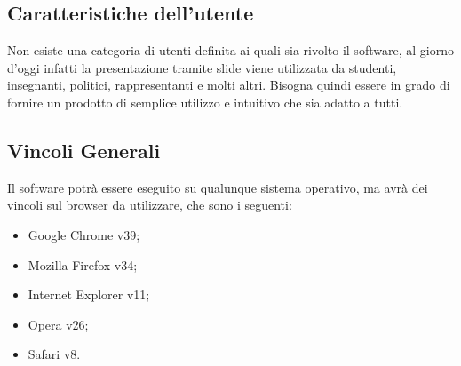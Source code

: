 \subsection{Caratteristiche dell'utente}
Non esiste una categoria di utenti definita ai quali sia rivolto il software, al giorno d'oggi infatti la presentazione tramite slide viene utilizzata da studenti, insegnanti, politici, rappresentanti e molti altri. Bisogna quindi essere in grado di fornire un prodotto di semplice utilizzo e intuitivo che sia adatto a tutti.

\subsection{Vincoli Generali}
Il software potrà essere eseguito su qualunque sistema operativo, ma avrà dei vincoli sul browser da utilizzare, che sono i seguenti:
\begin{itemize}
	\item Google Chrome v39;
	\item Mozilla Firefox v34;
	\item Internet Explorer v11;
	\item Opera v26;
	\item Safari v8.
\end{itemize}
